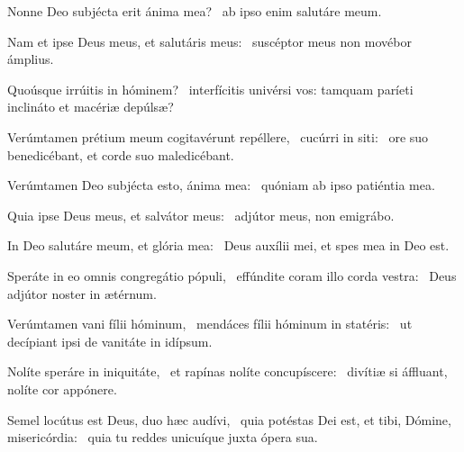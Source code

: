 \item Nonne Deo subjécta erit ánima mea?~\psstar{} ab ipso enim salutáre meum.

\item Nam et ipse Deus meus, et salutáris meus:~\psstar{} suscéptor meus non movébor ámplius.

\item Quoúsque irrúitis in hóminem?~\psstar{} interfícitis univérsi vos: tamquam paríeti inclináto et macériæ depúlsæ?

\item Verúmtamen prétium meum cogitavérunt repéllere,~\pscross{} cucúrri in siti:~\psstar{} ore suo benedicébant, et corde suo maledicébant.

\item Verúmtamen Deo subjécta esto, ánima mea:~\psstar{} quóniam ab ipso patiéntia mea.

\item Quia ipse Deus meus, et salvátor meus:~\psstar{} adjútor meus, non emigrábo.

\item In Deo salutáre meum, et glória mea:~\psstar{} Deus auxílii mei, et spes mea in Deo est.

\item Speráte in eo omnis congregátio pópuli,~\pscross{} effúndite coram illo corda vestra:~\psstar{} Deus adjútor noster in ætérnum.

\item Verúmtamen vani fílii hóminum,~\pscross{} mendáces fílii hóminum in statéris:~\psstar{} ut decípiant ipsi de vanitáte in idípsum.

\item Nolíte speráre in iniquitáte,~\pscross{} et rapínas nolíte concupíscere:~\psstar{} divítiæ si áffluant, nolíte cor appónere.

\item Semel locútus est Deus, duo hæc audívi,~\pscross{} quia potéstas Dei est, et tibi, Dómine, misericórdia:~\psstar{} quia tu reddes unicuíque juxta ópera sua.
